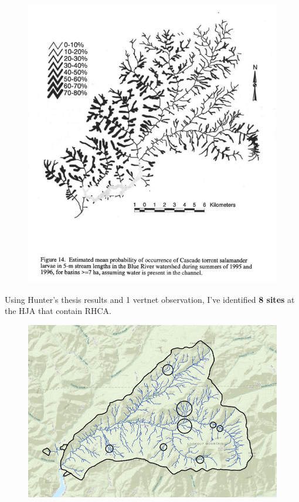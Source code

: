 \documentclass{article}
\begin{document}
\begin{figure}[h]
	\centering
	\includegraphics[scale=0.4]{Hunter.hj.probofoccurence.png}
\end{figure}

\newpage

\begin{flushleft}
	Using Hunter's thesis results and 1 vertnet observation, I've identified \textbf{8 sites} at the HJA that contain RHCA. 
\end{flushleft}

\begin{figure}[h]
	\centering
	\includegraphics[scale=0.50]{HJA.sampling.map12142022.png}
\end{figure}
\end{document}
